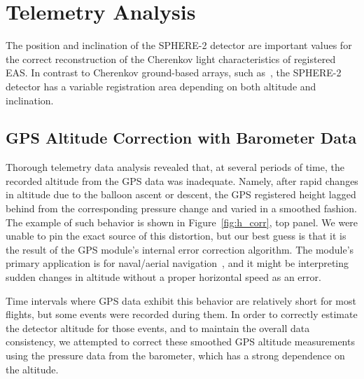 \documentclass[universe,article,accept,moreauthors,pdftex]{Definitions/mdpi}
\begin{document}
\section{Telemetry Analysis}

The position and inclination of the SPHERE-2 detector are important values for the correct reconstruction of the Cherenkov light characteristics of registered EAS. In contrast to Cherenkov ground-based arrays, such as~\cite{Yakutsk19,TUNKA133}, the SPHERE-2 detector has a variable registration area depending on both altitude and inclination.


\subsection{GPS Altitude Correction with Barometer Data}
\label{sect:gps_correction}

Thorough telemetry data analysis revealed that, at several periods of time, the recorded altitude from the GPS data was inadequate. Namely, after rapid changes in altitude due to the balloon ascent or descent, the GPS registered height lagged behind from the corresponding pressure change and varied in a smoothed fashion. The example of such behavior is shown in Figure~\ref{fig:h_corr}, top panel. We were unable to pin the exact source of this distortion, but our best guess is that it is the result of the GPS module's internal error correction algorithm. The module's primary application is for naval/aerial navigation~\cite{GPS-module-specs}, and it might be interpreting sudden changes in altitude without a proper horizontal speed as an error.




Time intervals where GPS data exhibit this behavior are relatively short for most flights, but some events were recorded during them. In order to correctly estimate the detector altitude for those events, and to maintain the overall data consistency, we attempted to correct these smoothed GPS altitude measurements using the pressure data from the barometer, which has a strong dependence on the altitude.
\end{document}
